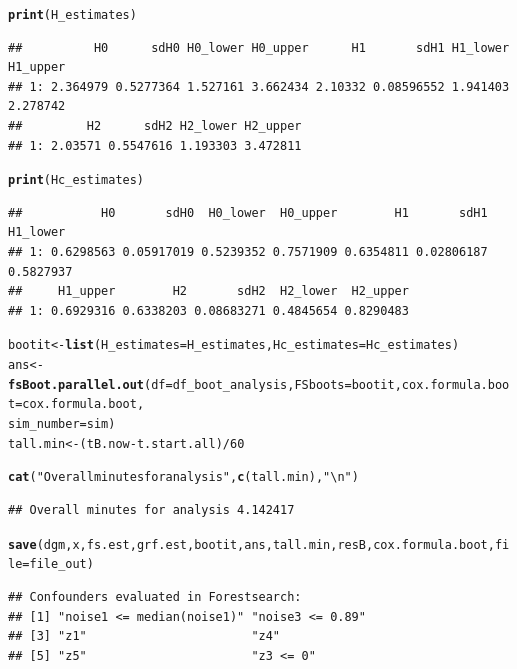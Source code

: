 \documentclass[12pt]{article}
\makeatletter
\newcommand{\hlnum}[1]{\textcolor[rgb]{0.686,0.059,0.569}{#1}}%
\newcommand{\hlstr}[1]{\textcolor[rgb]{0.192,0.494,0.8}{#1}}%
\newcommand{\hlopt}[1]{\textcolor[rgb]{0,0,0}{#1}}%
\newcommand{\hlstd}[1]{\textcolor[rgb]{0.345,0.345,0.345}{#1}}%
\newcommand{\hlkwb}[1]{\textcolor[rgb]{0.69,0.353,0.396}{#1}}%
\newcommand{\hlkwc}[1]{\textcolor[rgb]{0.333,0.667,0.333}{#1}}%
\newcommand{\hlkwd}[1]{\textcolor[rgb]{0.737,0.353,0.396}{\textbf{#1}}}%
\newenvironment{kframe}{%
 \def\at@end@of@kframe{}%
 \ifinner\ifhmode%
  \def\at@end@of@kframe{\end{minipage}}%
  \begin{minipage}{\columnwidth}%
 \fi\fi%
 \def\FrameCommand##1{\hskip\@totalleftmargin \hskip-\fboxsep
 \colorbox{shadecolor}{##1}\hskip-\fboxsep
     \hskip-\linewidth \hskip-\@totalleftmargin \hskip\columnwidth}%
 \MakeFramed {\advance\hsize-\width
   \@totalleftmargin\z@ \linewidth\hsize
   \@setminipage}}%
 {\par\unskip\endMakeFramed%
 \at@end@of@kframe}
\newenvironment{knitrout}{}{} %
\makeatother
\begin{document}
\begin{knitrout}
\begin{kframe}
\begin{alltt}
\hlkwd{print}\hlstd{(H_estimates)}
\end{alltt}
\begin{verbatim}
##          H0      sdH0 H0_lower H0_upper      H1       sdH1 H1_lower H1_upper
## 1: 2.364979 0.5277364 1.527161 3.662434 2.10332 0.08596552 1.941403 2.278742
##         H2      sdH2 H2_lower H2_upper
## 1: 2.03571 0.5547616 1.193303 3.472811
\end{verbatim}
\begin{alltt}
\hlkwd{print}\hlstd{(Hc_estimates)}
\end{alltt}
\begin{verbatim}
##           H0       sdH0  H0_lower  H0_upper        H1       sdH1  H1_lower
## 1: 0.6298563 0.05917019 0.5239352 0.7571909 0.6354811 0.02806187 0.5827937
##     H1_upper        H2       sdH2  H2_lower  H2_upper
## 1: 0.6929316 0.6338203 0.08683271 0.4845654 0.8290483
\end{verbatim}
\begin{alltt}
\hlstd{bootit} \hlkwb{<-} \hlkwd{list}\hlstd{(}\hlkwc{H_estimates} \hlstd{= H_estimates,} \hlkwc{Hc_estimates} \hlstd{= Hc_estimates)}
\hlstd{ans} \hlkwb{<-} \hlkwd{fsBoot.parallel.out}\hlstd{(}\hlkwc{df} \hlstd{= df_boot_analysis,} \hlkwc{FSboots} \hlstd{= bootit,} \hlkwc{cox.formula.boot} \hlstd{= cox.formula.boot,}
    \hlkwc{sim_number} \hlstd{= sim)}
\hlstd{tall.min} \hlkwb{<-} \hlstd{(tB.now} \hlopt{-} \hlstd{t.start.all)}\hlopt{/}\hlnum{60}

\hlkwd{cat}\hlstd{(}\hlstr{"Overall minutes for analysis"}\hlstd{,} \hlkwd{c}\hlstd{(tall.min),} \hlstr{"\textbackslash{}n"}\hlstd{)}
\end{alltt}
\begin{verbatim}
## Overall minutes for analysis 4.142417
\end{verbatim}
\begin{alltt}
\hlkwd{save}\hlstd{(dgm, x, fs.est, grf.est, bootit, ans, tall.min, resB, cox.formula.boot,} \hlkwc{file} \hlstd{= file_out)}
\end{alltt}
\end{kframe}
\end{knitrout}


\begin{knitrout}
\color{fgcolor}\begin{kframe}
\begin{verbatim}
## Confounders evaluated in Forestsearch:
## [1] "noise1 <= median(noise1)" "noise3 <= 0.89"          
## [3] "z1"                       "z4"                      
## [5] "z5"                       "z3 <= 0"
\end{verbatim}
\end{kframe}
\end{knitrout}
\end{document}
